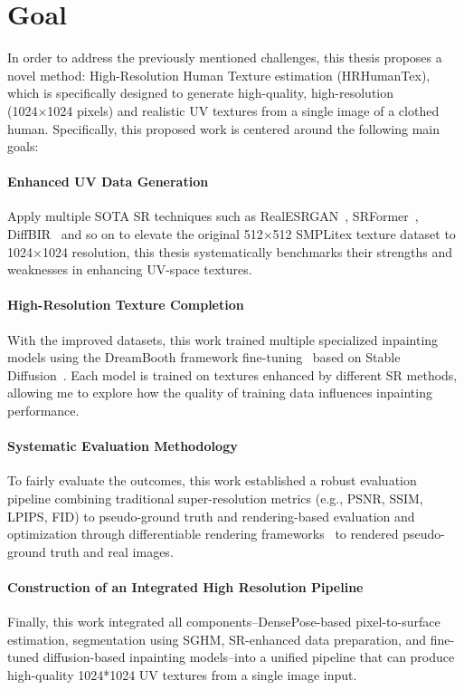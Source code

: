 \section{Goal}
In order to address the previously mentioned challenges, this thesis proposes a novel method: High-Resolution Human Texture estimation (HRHumanTex), which is specifically designed to generate high-quality, high-resolution (1024×1024 pixels) and realistic UV textures from a single image of a clothed human. Specifically, this proposed work is centered around the following main goals:

\paragraph{Enhanced UV Data Generation}
Apply multiple \ac{SOTA} \ac{SR} techniques such as RealESRGAN~\cite{wang2021realesrgan}, SRFormer~\cite{zhou2023srformer}, DiffBIR~\cite{lin2024diffbir} and so on to elevate the original 512×512 SMPLitex texture dataset to 1024×1024 resolution, this thesis systematically benchmarks their strengths and weaknesses in enhancing UV-space textures.

\paragraph{High-Resolution Texture Completion}
With the improved datasets, this work trained multiple specialized inpainting models using the DreamBooth framework fine-tuning~\cite{ruiz2023dreamboothfinetuningtexttoimage} based on Stable Diffusion~\cite{rombach2021highresolution}. Each model is trained on textures enhanced by different SR methods, allowing me to explore how the quality of training data influences inpainting performance.

\paragraph{Systematic Evaluation Methodology}
To fairly evaluate the outcomes, this work established a robust evaluation pipeline combining traditional super-resolution metrics (e.g., \ac{PSNR}, \ac{SSIM}, \ac{LPIPS}, \ac{FID}) to pseudo-ground truth and rendering-based evaluation and optimization through differentiable rendering frameworks~\cite{ravi2020pytorch3d} to rendered pseudo-ground truth and real images.

\paragraph{Construction of an Integrated High Resolution Pipeline}
Finally, this work integrated all components--DensePose-based pixel-to-surface estimation, segmentation using SGHM, SR-enhanced data preparation, and fine-tuned diffusion-based inpainting models--into a unified pipeline that can produce high-quality 1024*1024 UV textures from a single image input.

